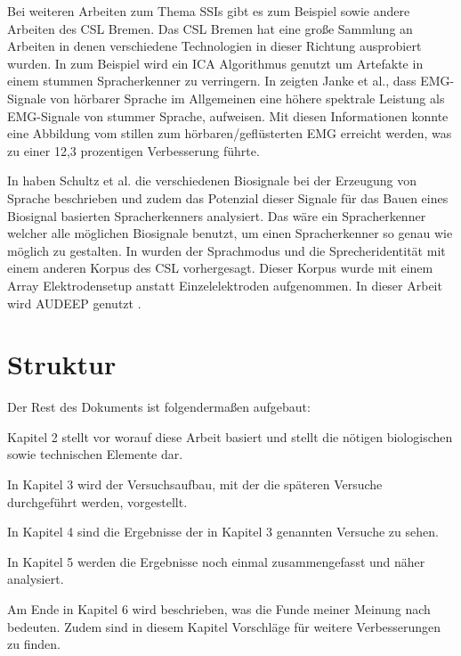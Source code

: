 Bei weiteren Arbeiten zum Thema SSIs gibt es zum Beispiel \cite{8114359} sowie andere Arbeiten des CSL Bremen. Das CSL Bremen hat eine große Sammlung an Arbeiten in denen verschiedene Technologien in dieser Richtung ausprobiert wurden. In \cite{wand2013artifact} zum Beispiel wird ein ICA Algorithmus genutzt um Artefakte in einem stummen Spracherkenner zu verringern. In \cite{janke2010spectral} zeigten Janke et al., dass EMG-Signale von hörbarer Sprache im Allgemeinen eine höhere spektrale Leistung als EMG-Signale von stummer Sprache, aufweisen. Mit diesen Informationen konnte eine Abbildung vom stillen zum hörbaren/geflüsterten EMG erreicht werden, was zu einer 12,3 prozentigen Verbesserung führte.

\clearpage
In \cite{8114358} haben Schultz et al. die verschiedenen Biosignale bei der Erzeugung von Sprache beschrieben und zudem das Potenzial dieser Signale für das Bauen eines Biosignal basierten Spracherkenners analysiert. Das wäre ein Spracherkenner welcher alle möglichen Biosignale benutzt,  um einen Spracherkenner so genau wie möglich zu gestalten.
In \cite{diener2020towards} wurden der Sprachmodus und die Sprecheridentität mit einem anderen Korpus des CSL vorhergesagt. Dieser Korpus wurde mit einem Array Elektrodensetup anstatt Einzelelektroden aufgenommen. In dieser Arbeit wird AUDEEP genutzt \cite{AUDEEP-GIT}. 

\section{Struktur}
Der Rest des Dokuments ist folgendermaßen aufgebaut:


Kapitel 2 stellt vor worauf diese Arbeit basiert und stellt die nötigen biologischen sowie technischen Elemente dar. 



In Kapitel 3 wird der Versuchsaufbau, mit der die späteren Versuche durchgeführt werden, vorgestellt. 



In Kapitel 4 sind die Ergebnisse der in Kapitel 3 genannten Versuche zu sehen. 


In Kapitel 5 werden die Ergebnisse noch einmal zusammengefasst und näher analysiert. 


Am Ende in Kapitel 6 wird beschrieben, was die Funde meiner Meinung nach bedeuten. Zudem sind in diesem Kapitel Vorschläge für weitere Verbesserungen zu finden.